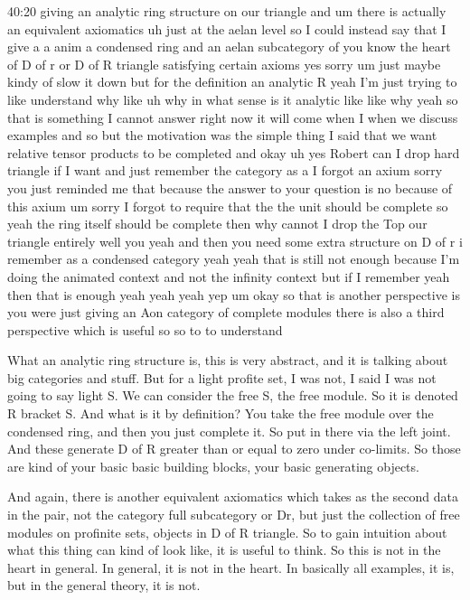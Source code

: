 \begin{unfinished}{40:20}
giving an analytic ring structure on our triangle and um there is actually an equivalent axiomatics uh just at the aelan level so I could instead say that I give a a anim a condensed ring and an aelan subcategory of you know the heart of D of r or D of R triangle satisfying certain axioms yes sorry um just maybe kindy of slow it down but for the definition an analytic R yeah I'm just trying to like understand why like uh why in what sense is it analytic like like why yeah so that is something I cannot answer right now it will come when I when we discuss examples and so but the motivation was the simple thing I said that we want relative tensor products to be completed and okay uh yes Robert can I drop hard triangle if I want and just remember the category as a I forgot an axium sorry you just reminded me that because the answer to your question is no because of this axium um sorry I forgot to require that the the unit should be complete so yeah the ring itself should be complete then why cannot I drop the Top our triangle entirely well you yeah and then you need some extra structure on D of r i remember as a condensed category yeah yeah that is still not enough because I'm doing the animated context and not the infinity context but if I remember yeah then that is enough yeah yeah yeah yep um okay so that is another perspective is you were just giving an Aon category of complete modules there is also a third perspective which is useful so so to to understand

What an analytic ring structure is, this is very abstract, and it is talking about big categories and stuff. But for a light profite set, I was not, I said I was not going to say light S. We can consider the free S, the free module. So it is denoted R bracket S. And what is it by definition? You take the free module over the condensed ring, and then you just complete it. So put in there via the left joint. And these generate D of R greater than or equal to zero under co-limits. So those are kind of your basic basic building blocks, your basic generating objects. 

And again, there is another equivalent axiomatics which takes as the second data in the pair, not the category full subcategory or Dr, but just the collection of free modules on profinite sets, objects in D of R triangle. So to gain intuition about what this thing can kind of look like, it is useful to think. So this is not in the heart in general. In general, it is not in the heart. In basically all examples, it is, but in the general theory, it is not. 


\end{unfinished}
